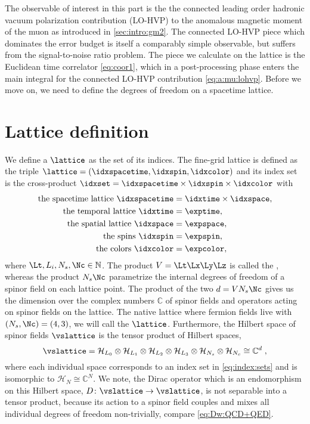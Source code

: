 The observable of interest in this part is the the connected leading order hadronic vacuum polarization contribution (LO-HVP) to the anomalous magnetic moment of the muon as introduced in \cref{sec:intro:gm2}.
The connected LO-HVP piece which dominates the error budget is itself a comparably simple observable, but suffers from the signal-to-noise ratio problem.
The piece we calculate on the lattice is the Euclidean time correlator \cref{eq:coor1}, which in a post-processing phase enters the main integral for the connected LO-HVP contribution \cref{eq:a:mu:lohvp}.
Before we move on, we need to define the degrees of freedom on a spacetime lattice.

\section{Lattice definition}
\label{sec:lattice:definition}

We define a  $\lattice$ as the set of its indices.
The fine-grid lattice is defined as the triple $\lattice = (\idxspacetime, \idxspin, \idxcolor)$ and its index set is the cross-product $\idxset = \idxspacetime \times \idxspin \times \idxcolor$ with
\begin{align}
\begin{aligned}
\text{the spacetime lattice }
    \idxspacetime &= \idxtime \times \idxspace, \\
\text{the temporal lattice }
    \idxtime  &= \exptime, \\
\text{the spatial lattice }
    \idxspace &= \expspace, \\
\text{the spins }
    \idxspin  &= \expspin, \\
\text{the colors }
    \idxcolor &= \expcolor,
\end{aligned} \label{eq:index:sets}
\end{align}
where $\Lt,L_i,N_s,\Nc \in \mathbb{N}$.
The product $V = \Lt \Lx \Ly \Lz$ is called the , whereas the product $N_s \Nc$ parametrize the internal degrees of freedom of a spinor field on each lattice point.
The product of the two $d = V N_s \Nc$ gives us the dimension over the complex numbers $\mathbb{C}$ of spinor fields and operators acting on spinor fields on the lattice.
The native lattice where fermion fields live with $(N_s, \Nc) = (4,3)$, we will call the  $\lattice$.
Furthermore, the Hilbert space of spinor fields $\vslattice$ is the tensor product of Hilbert spaces,
\begin{equation}
\vslattice = \mathcal{H}_{L_0} \otimes \mathcal{H}_{L_1} \otimes \mathcal{H}_{L_2} \otimes \mathcal{H}_{L_3} \otimes \mathcal{H}_{N_s} \otimes \mathcal{H}_{N_c} \cong \mathbb{C}^{d} \;,
\end{equation}
where each individual space corresponds to an index set in \cref{eq:index:sets} and is isomorphic to $\mathcal{H}_{N} \cong \mathbb{C}^{N}$.
We note, the Dirac operator which is an endomorphism on this Hilbert space, $D \colon \vslattice \rightarrow \vslattice$, is not separable into a tensor product, because its action to a spinor field couples and mixes all individual degrees of freedom non-trivially, compare \cref{eq:Dw:QCD+QED}.

